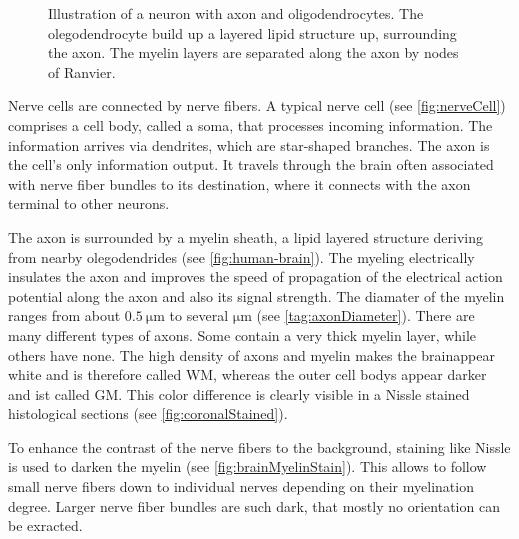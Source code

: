 \begin{figure}[!t]
\caption{Illustration of a neuron with axon and oligodendrocytes. The olegodendrocyte build up a layered lipid structure up, surrounding the axon. The myelin layers are separated along the axon by nodes of Ranvier.}
\label{fig:CortexAndNerveCell}
\end{figure}
%
Nerve cells are connected by nerve fibers.
A typical nerve cell (see \cref{fig:nerveCell}) comprises a cell body, called a soma, that processes incoming information.
The information arrives via dendrites, which are star-shaped branches.
The axon is the cell's only information output.
It travels through the brain often associated with nerve fiber bundles to its destination, where it connects with the axon terminal to other neurons.
\par
%
The axon is surrounded by a myelin sheath, a lipid layered structure deriving from nearby olegodendrides (see \cref{fig:human-brain}).
The myeling electrically insulates the axon and improves the speed of propagation of the electrical action potential along the axon and also its signal strength.
The diamater of the myelin ranges from about $\SI{0.5}{\micro\meter}$ to several $\si{\micro\meter}$ (see \cref{tag:axonDiameter}).
There are many different types of axons.
Some contain a very thick myelin layer, while others have none.
The high density of axons and myelin makes the brainappear white and is therefore called \ac{WM}, whereas the outer cell bodys appear darker and ist called \ac{GM}.
This color difference is clearly visible in a Nissle stained histological sections (see \cref{fig:coronalStained}).
\par
%
To enhance the contrast of the nerve fibers to the background, staining like Nissle is used to darken the myelin (see \cref{fig:brainMyelinStain}).
This allows to follow small nerve fibers down to individual nerves depending on their myelination degree.
Larger nerve fiber bundles are such dark, that mostly no orientation can be exracted.
\par
